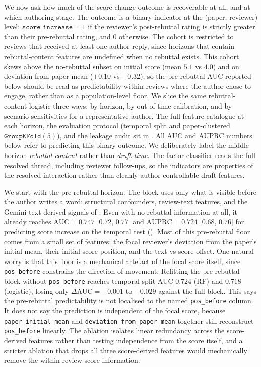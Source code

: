 \documentclass{article}
\newcommand{\code}[1]{\texttt{#1}}
\newcommand{\auc}{\text{AUC}}
\newcommand{\auprc}{\text{AUPRC}}
\begin{document}
We now ask how much of the score-change outcome is recoverable at all, and at which authoring stage. The outcome is a binary indicator at the (paper, reviewer) level: $\code{score\_increase} = 1$ if the reviewer's post-rebuttal rating is strictly greater than their pre-rebuttal rating, and $0$ otherwise. The cohort is restricted to reviews that received at least one author reply, since horizons that contain rebuttal-content features are undefined when no rebuttal exists. This cohort skews above the no-rebuttal subset on initial score (mean $5.1$ vs $4.0$) and on deviation from paper mean ($+0.10$ vs $-0.32$), so the pre-rebuttal $\auc$ reported below should be read as predictability within reviews where the author chose to engage, rather than as a population-level floor. We slice the same rebuttal-content logistic three ways: by horizon, by out-of-time calibration, and by scenario sensitivities for a representative author. The full feature catalogue at each horizon, the evaluation protocol (temporal split and paper-clustered $\texttt{GroupKFold}(5)$), and the leakage audit sit in . All AUC and AUPRC numbers below refer to predicting this binary outcome. We deliberately label the middle horizon \emph{rebuttal-content} rather than \emph{draft-time}. The factor classifier reads the full resolved thread, including reviewer follow-ups, so the indicators are properties of the resolved interaction rather than cleanly author-controllable draft features.

We start with the pre-rebuttal horizon. The block uses only what is visible before the author writes a word: structural confounders, review-text features, and the Gemini text-derived signals of . Even with no rebuttal information at all, it already reaches $\auc = 0.747$ [$0.72$, $0.77$] and $\auprc = 0.724$ [$0.68$, $0.76$] for predicting score increase on the temporal test (). Most of this pre-rebuttal floor comes from a small set of features: the focal reviewer's deviation from the paper's initial mean, their initial-score position, and the text-vs-score offset. One natural worry is that this floor is a mechanical artefact of the focal score itself, since \code{pos\_before} constrains the direction of movement. Refitting the pre-rebuttal block without \code{pos\_before} reaches temporal-split AUC $0.724$ (RF) and $0.718$ (logistic), losing only $\Delta\auc = -0.001$ to $-0.029$ against the full block. This says the pre-rebuttal predictability is not localised to the named \code{pos\_before} column. It does not say the prediction is independent of the focal score, because \code{paper\_initial\_mean} and \code{deviation\_from\_paper\_mean} together still reconstruct \code{pos\_before} linearly. The ablation isolates linear redundancy across the score-derived features rather than testing independence from the score itself, and a stricter ablation that drops all three score-derived features would mechanically remove the within-review score information.
\end{document}
